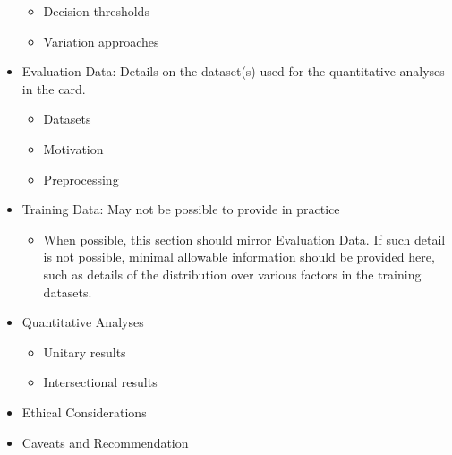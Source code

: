 \begin{itemize}
\begin{itemize}
      \item   Decision thresholds
      \item   Variation approaches
    \end{itemize}
  \item   Evaluation Data: Details on the dataset(s) used for the quantitative  analyses in the card.
    \begin{itemize}
      \item   Datasets
      \item   Motivation
      \item   Preprocessing
    \end{itemize}  
  \item   Training Data: May not be possible to provide in practice
    \begin{itemize}
      \item   When possible, this section should mirror Evaluation Data. If such detail is not possible, minimal allowable information should be provided here, such as details of the distribution over various factors in the training  datasets.
    \end{itemize}
  \item   Quantitative Analyses
    \begin{itemize}
      \item   Unitary results
      \item   Intersectional results
    \end{itemize}
  \item   Ethical Considerations
  \item   Caveats and Recommendation
\end{itemize}